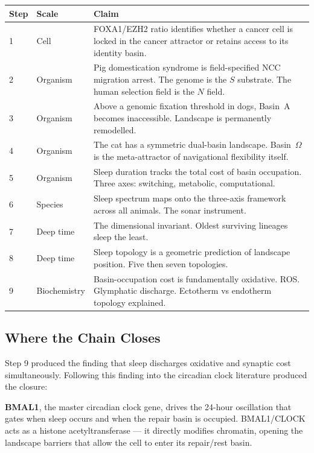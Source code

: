 \documentclass[10pt, a4paper]{article}
\begin{document}
\begin{center}
\small
\begin{tabular}{p{1.0cm}p{4.5cm}p{6.5cm}}
\toprule
\textbf{Step} & \textbf{Scale} &
\textbf{Claim}\\
\midrule
1 & Cell & FOXA1/EZH2 ratio identifies
whether a cancer cell is locked in the
cancer attractor or retains access to
its identity basin.\\[0.3em]
2 & Organism & Pig domestication
syndrome is field-specified NCC
migration arrest. The genome is the
$S$ substrate. The human selection
field is the $N$ field.\\[0.3em]
3 & Organism & Above a genomic fixation
threshold in dogs, Basin~A becomes
inaccessible. Landscape is permanently
remodelled.\\[0.3em]
4 & Organism & The cat has a symmetric
dual-basin landscape. Basin~$\Omega$
is the meta-attractor of navigational
flexibility itself.\\[0.3em]
5 & Organism & Sleep duration tracks the
total cost of basin occupation. Three
axes: switching, metabolic,
computational.\\[0.3em]
6 & Species & Sleep spectrum maps onto
the three-axis framework across all
animals. The sonar instrument.\\[0.3em]
7 & Deep time & The dimensional
invariant. Oldest surviving lineages
sleep the least.\\[0.3em]
8 & Deep time & Sleep topology is a
geometric prediction of landscape
position. Five then seven topologies.\\[0.3em]
9 & Biochemistry & Basin-occupation
cost is fundamentally oxidative. ROS.
Glymphatic discharge. Ectotherm vs
endotherm topology explained.\\
\bottomrule
\end{tabular}
\end{center}

\subsection{Where the Chain Closes}

Step 9 produced the finding that sleep
discharges oxidative and synaptic cost
simultaneously. Following this finding
into the circadian clock literature
produced the closure:

\textbf{BMAL1}, the master circadian
clock gene, drives the 24-hour
oscillation that gates when sleep occurs
and when the repair basin is occupied.
BMAL1/CLOCK acts as a histone
acetyltransferase --- it directly
modifies chromatin, opening the
landscape barriers that allow the cell
to enter its repair/rest basin.
\end{document}
